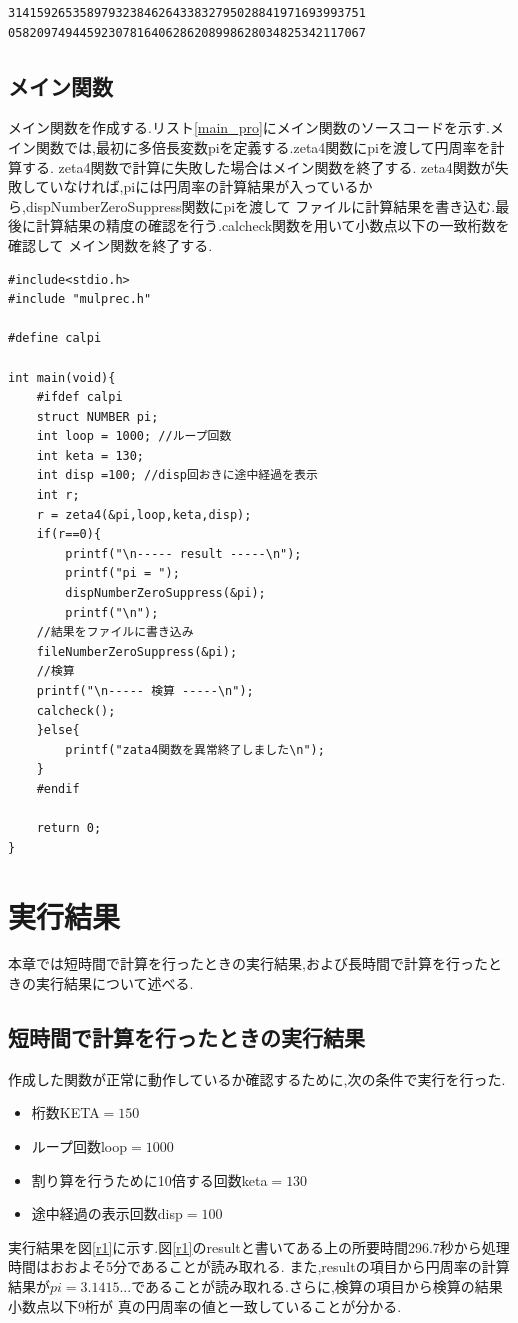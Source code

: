 \documentclass[a4j] {jarticle}
\begin{document}
  \begin{lstlisting}[basicstyle=\ttfamily\footnotesize, frame=single,label=pi_real,caption=pi.txtの内容]
31415926535897932384626433832795028841971693993751
05820974944592307816406286208998628034825342117067
  \end{lstlisting}

\subsection{メイン関数}
メイン関数を作成する.リスト\ref{main_pro}にメイン関数のソースコードを示す.メイン関数では,最初に多倍長変数piを定義する.zeta4関数にpiを渡して円周率を計算する.
zeta4関数で計算に失敗した場合はメイン関数を終了する.
zeta4関数が失敗していなければ,piには円周率の計算結果が入っているから,dispNumberZeroSuppress関数にpiを渡して
ファイルに計算結果を書き込む.最後に計算結果の精度の確認を行う.calcheck関数を用いて小数点以下の一致桁数を確認して
メイン関数を終了する.
\begin{lstlisting}[basicstyle=\ttfamily\footnotesize, frame=single,label=main_pro,caption=メイン関数のソースコード]
#include<stdio.h>
#include "mulprec.h"

#define calpi

int main(void){
    #ifdef calpi    
    struct NUMBER pi;
    int loop = 1000; //ループ回数
    int keta = 130;
    int disp =100; //disp回おきに途中経過を表示
    int r;
    r = zeta4(&pi,loop,keta,disp);
    if(r==0){
        printf("\n----- result -----\n");
        printf("pi = ");
        dispNumberZeroSuppress(&pi);
        printf("\n");
    //結果をファイルに書き込み
    fileNumberZeroSuppress(&pi);
    //検算
    printf("\n----- 検算 -----\n");
    calcheck();
    }else{
        printf("zata4関数を異常終了しました\n");
    }
    #endif

    return 0;
}
\end{lstlisting}

    
\section{実行結果}
    本章では短時間で計算を行ったときの実行結果,および長時間で計算を行ったときの実行結果について述べる.
    \subsection{短時間で計算を行ったときの実行結果}
    作成した関数が正常に動作しているか確認するために,次の条件で実行を行った.
    \begin{itemize}
        \item 桁数KETA$=150$
        \item ループ回数loop$=1000$
        \item 割り算を行うために10倍する回数keta$=130$
        \item 途中経過の表示回数disp$=100$
      \end{itemize}
      実行結果を図\ref{r1}に示す.図\ref{r1}のresultと書いてある上の所要時間296.7秒から処理時間はおおよそ5分であることが読み取れる.
      また,resultの項目から円周率の計算結果が$pi=3.1415...$であることが読み取れる.さらに,検算の項目から検算の結果小数点以下9桁が
      真の円周率の値と一致していることが分かる.
\end{document}
